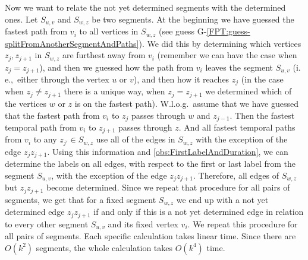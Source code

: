 \documentclass[a4paper,UKenglish,cleveref, autoref, thm-restate]{lipics-v2021}
\newcommand{\ie}{i.\,e.,\ }
\begin{document}
Now we want to relate the not yet determined segments with the determined ones.
Let $S_{u,v}$ and $S_{w,z}$ be two segments.
At the beginning we have guessed the fastest path from $v_i$ to all vertices in $S_{w,z}$ (see guess G-\ref{FPT:guess-splitFromAnotherSegmentAndPaths}).
We did this by determining which vertices $z_j, z_{j+1}$ in $S_{w,z}$ are furthest away from $v_i$
(remember we can have the case when $z_j = z_{j+1}$),
and then we guessed how the path from $v_i$ leaves the segment $S_{u,v}$ (\ie either through the vertex $u$ or $v$),
and then how it reaches $z_j$ (in the case when $z_j \neq z_{j+1}$ there is a unique way,
when $z_j = z_{j+1}$ we determined which of the vertices $w$ or $z$ is on the fastest path).
W.l.o.g.\ assume that we have guessed that the fastest path from $v_i$ to $z_j$
passes through $w$ and $z_{j-1}$.
Then the fastest temporal path from $v_i$ to $z_{j+1}$ passes through $z$.
And all fastest temporal paths from $v_i$ to any $z_{j'} \in S_{w,z}$
use all of the edges in $S_{w,z}$ with the exception of the edge $z_j z_{j+1}$.
Using this information and \cref{obs:FirstLabelAndDuration}, we can determine the labels on all edges, with respect to the first or last label from the segment $S_{u,v}$,
with the exception of the edge $z_j z_{j+1}$.
Therefore, all edges of $S_{w,z}$ but $z_j z_{j+1}$ become determined.
Since we repeat that procedure for all pairs of segments,
we get that for a fixed segment $S_{w,z}$ we end up with a not yet determined edge $z_j z_{j+1}$
if and only if this is a not yet determined edge in relation to every other segment $S_{u,v}$ and its fixed vertex $v_i$.
%
We repeat this procedure for all pairs of segments.
Each specific calculation takes linear time. Since there are $O(k^2)$ segments, the whole calculation takes $O(k^4)$ time.
\end{document}
